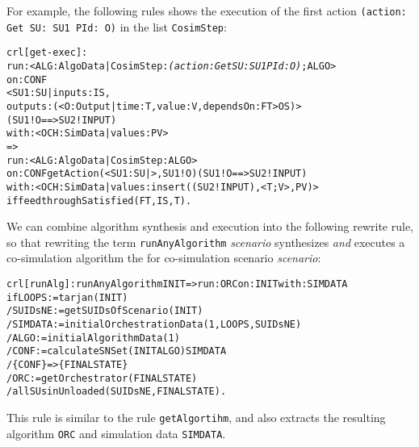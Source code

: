 For example, the following rules shows the execution of the first action \texttt{(action: Get SU: SU1 PId: O)} in the list \texttt{CosimStep}:

\scriptsize
\begin{alltt}
crl [get-exec] : 
    run: < ALG : AlgoData | CosimStep : \emph{(action: Get SU: SU1 PId: O)} ; ALGO >
    on: CONF
      < SU1 : SU | inputs : IS,
                   outputs : (< O : Output | time : T, value : V, dependsOn : FT > OS) > 
      ( SU1 ! O ==> SU2 ! INPUT)
    with: < OCH : SimData | values : PV >
    => 
    run: < ALG : AlgoData | CosimStep : ALGO >
    on: CONF getAction(< SU1 : SU | >, SU1 ! O) ( SU1 ! O ==> SU2 ! INPUT)
    with: < OCH : SimData | values : insert((SU2 ! INPUT), < T ; V >, PV) > 
 if feedthroughSatisfied(FT, IS, T) .
\end{alltt}
\normalsize


We can combine algorithm synthesis and execution into the following rewrite rule, so that rewriting the term \texttt{runAnyAlgorithm} \emph{scenario} synthesizes \emph{and} executes a co-simulation algorithm the for co-simulation scenario \emph{scenario}:

\small
\begin{alltt}
crl [runAlg] : runAnyAlgorithm INIT => run: ORC on: INIT with: SIMDATA
  if LOOPS := tarjan(INIT)
  / SUIDsNE := getSUIDsOfScenario(INIT)
  / SIMDATA := initialOrchestrationData(1,LOOPS,SUIDsNE)
  / ALGO := initialAlgorithmData(1)
  / CONF := calculateSNSet(INIT ALGO) SIMDATA 
  / \{CONF\} => \{ FINALSTATE \} 
  / ORC := getOrchestrator(FINALSTATE)
  / allSUsinUnloaded(SUIDsNE, FINALSTATE) .
\end{alltt}
\normalsize

This rule is similar to the rule \texttt{getAlgortihm}, and also extracts the resulting algorithm \texttt{ORC} and simulation data \texttt{SIMDATA}.

